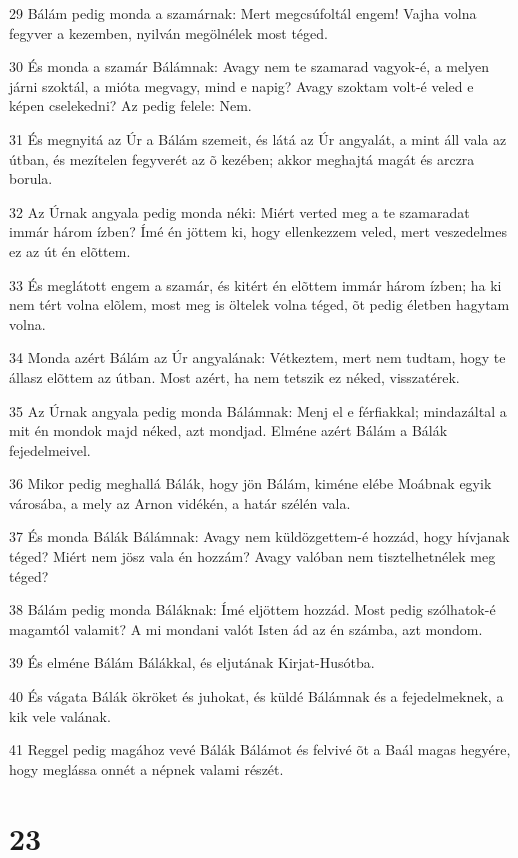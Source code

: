 \par 29 Bálám pedig monda a szamárnak: Mert megcsúfoltál engem! Vajha volna fegyver a kezemben, nyilván megölnélek most téged.
\par 30 És monda a szamár Bálámnak: Avagy nem te szamarad vagyok-é, a melyen járni szoktál, a mióta megvagy, mind e napig? Avagy szoktam volt-é veled e képen cselekedni? Az pedig felele: Nem.
\par 31 És megnyitá az Úr a Bálám szemeit, és látá az Úr angyalát, a mint áll vala az útban, és mezítelen fegyverét az õ kezében; akkor meghajtá magát és arczra borula.
\par 32 Az Úrnak angyala pedig monda néki: Miért verted meg a te szamaradat immár három ízben? Ímé én jöttem ki, hogy ellenkezzem veled, mert veszedelmes ez az út én elõttem.
\par 33 És meglátott engem a szamár, és kitért én elõttem immár három ízben; ha ki nem tért volna elõlem, most meg is öltelek volna téged, õt pedig életben hagytam volna.
\par 34 Monda azért Bálám az Úr angyalának: Vétkeztem, mert nem tudtam, hogy te állasz elõttem az útban. Most azért, ha nem tetszik ez néked, visszatérek.
\par 35 Az Úrnak angyala pedig monda Bálámnak: Menj el e férfiakkal; mindazáltal a mit én mondok majd néked, azt mondjad. Elméne azért Bálám a Bálák fejedelmeivel.
\par 36 Mikor pedig meghallá Bálák, hogy jön Bálám, kiméne elébe Moábnak egyik városába, a mely az Arnon vidékén, a határ szélén vala.
\par 37 És monda Bálák Bálámnak: Avagy nem küldözgettem-é hozzád, hogy hívjanak téged? Miért nem jösz vala én hozzám? Avagy valóban nem tisztelhetnélek meg téged?
\par 38 Bálám pedig monda Báláknak: Ímé eljöttem hozzád. Most pedig szólhatok-é magamtól valamit? A mi mondani valót Isten ád az én számba, azt mondom.
\par 39 És elméne Bálám Bálákkal, és eljutának Kirjat-Husótba.
\par 40 És vágata Bálák ökröket és juhokat, és küldé Bálámnak és a fejedelmeknek, a kik vele valának.
\par 41 Reggel pedig magához vevé Bálák Bálámot és felvivé õt a Baál magas hegyére, hogy meglássa onnét a népnek valami részét.

\chapter{23}

